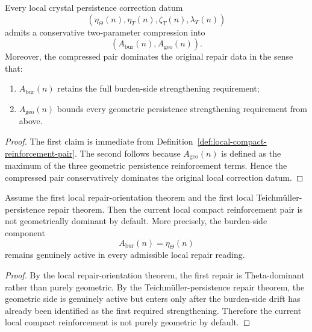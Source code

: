 \begin{proposition}
\label{prop:crystal-persistence-correction-datum-admits-two-parameter-compression}
Every local crystal persistence correction datum
\[
  (\eta_{\Theta}(n),\eta_T(n),\zeta_T(n),\lambda_T(n))
\]
admits a conservative two-parameter compression into
\[
  (A_{\mathrm{bur}}(n),A_{\mathrm{geo}}(n)).
\]
Moreover, the compressed pair dominates the original repair data in the sense that:
\begin{enumerate}[leftmargin=2em,label=(\alph*)]
  \item $A_{\mathrm{bur}}(n)$ retains the full burden-side strengthening requirement;
  \item $A_{\mathrm{geo}}(n)$ bounds every geometric persistence strengthening requirement from above.
\end{enumerate}
\end{proposition}

\begin{proof}
The first claim is immediate from Definition~\ref{def:local-compact-reinforcement-pair}.
The second follows because $A_{\mathrm{geo}}(n)$ is defined as the maximum of the three geometric persistence reinforcement terms.
Hence the compressed pair conservatively dominates the original local correction datum.
\end{proof}

\begin{proposition}
\label{prop:current-local-reinforcement-is-not-purely-geometric}
Assume the first local repair-orientation theorem and the first local Teichmüller-persistence repair theorem.
Then the current local compact reinforcement pair is not geometrically dominant by default.
More precisely, the burden-side component
\[
  A_{\mathrm{bur}}(n)=\eta_{\Theta}(n)
\]
remains genuinely active in every admissible local repair reading.
\end{proposition}

\begin{proof}
By the local repair-orientation theorem, the first repair is Theta-dominant rather than purely geometric.
By the Teichmüller-persistence repair theorem, the geometric side is genuinely active but enters only after the burden-side drift has already been identified as the first required strengthening.
Therefore the current local compact reinforcement is not purely geometric by default.
\end{proof}

